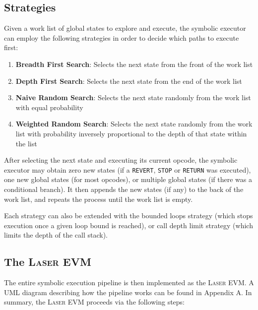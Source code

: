 \subsection{Strategies}

Given a work list of global states to explore and execute, the symbolic executor can employ the following strategies
in order to decide which paths to execute first:

\begin{enumerate}
    \item \textbf{Breadth First Search}: 
    Selects the next state from the front of the work list
    

    \item \textbf{Depth First Search}: 
    Selects the next state from the end of the work list

    \item \textbf{Naive Random Search}: 
    Selects the next state randomly from the work list with equal probability

    \item \textbf{Weighted Random Search}: 
    Selects the next state randomly from the work list with probability inversely proportional to
    the depth of that state within the list
\end{enumerate}

After selecting the next state and executing its current opcode, the symbolic executor may obtain 
zero new states (if a \texttt{REVERT}, \texttt{STOP} or \texttt{RETURN} was executed), one new global states (for most opcodes), 
or multiple global states (if there was a conditional branch). It then appends the new states (if any) to the back 
of the work list, and repeats the process until the work list is empty.

Each strategy can also be extended with the bounded loops strategy (which stops execution once a given 
loop bound is reached), or call depth limit strategy (which limits the depth of the call stack).

\subsection{The \textsc{Laser} EVM}

The entire symbolic execution pipeline is then implemented as the \textsc{Laser} EVM. A UML diagram describing
how the pipeline works can be found in Appendix A. In summary, the \textsc{Laser} EVM proceeds via the
following steps:

